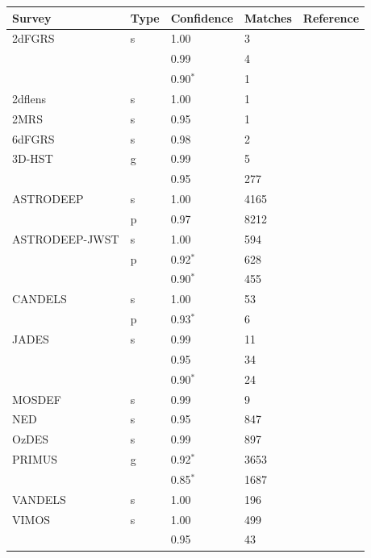 \begin{table}[!p]
    \centering
    \begin{tabular}{lllll}
        \hline
        Survey & Type & Confidence & Matches& Reference \\
        \hline
        \hline
        2dFGRS & s & 1.00 & 3 & \citet{colless2001} \\
               &   & 0.99 & 4 & \\
               &   & 0.90$^{*}$ & 1 & \\
        2dflens & s & 1.00 & 1 & \citet{blake2016} \\
        2MRS & s & 0.95 & 1 & \citet{huchra2012} \\
        6dFGRS & s & 0.98 & 2 & \citet{jones2009} \\
        3D-HST & g & 0.99 & 5 & \citet{momcheva2016} \\
               &   & 0.95 & 277 & \\
        ASTRODEEP & s & 1.00 & 4165 & \citet{merlin2021} \\
                  & p & 0.97 & 8212 & \\
        ASTRODEEP-JWST & s & 1.00 & 594 & \citet{merlin2024} \\
                       & p & 0.92$^{*}$ & 628 & \\
                       &   & 0.90$^{*}$ & 455 & \\
        CANDELS & s & 1.00 & 53 & \citet{kodra2023} \\
                & p & 0.93$^{*}$ & 6 & \\
        JADES & s & 0.99 & 11 & \citet{deugenio2025} \\
              &   & 0.95 & 34 & \\
              &   & 0.90$^{*}$ & 24 & \\
        MOSDEF & s & 0.99 & 9 & \citet{kriek2015} \\
        NED & s & 0.95 & 847 & \citet{helou1991} \\
        OzDES & s & 0.99 & 897 & \citet{lidman2020} \\
        PRIMUS & g & 0.92$^{*}$ & 3653 & \citet{cool2013} \\
               &   & 0.85$^{*}$ & 1687 & \\
        VANDELS & s & 1.00 & 196 & \citet{garilli2021} \\
        VIMOS & s & 1.00 & 499 & \citet{balestra2010} \\
                  &   & 0.95 & 43 & \\

\end{tabular}
\end{table}
